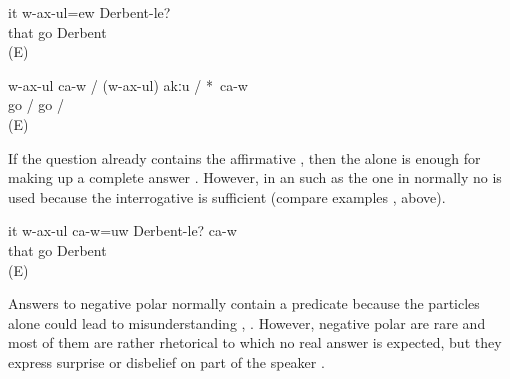 \begin{exe}
	\ex	\label{ex:Is he going to Derbent}
	\gll	it	w-ax-ul=ew	Derbent-le?\\
		that	go	Derbent\\
	\glt	{} (E)

	\ex	\label{ex:He is going / not going}
	\gll	w-ax-ul		ca-w	/	(w-ax-ul)		akːu		/	*~ca-w\\
		go		/	go		/	{\hphantom{*}}~\\
	\glt	{} (E)
\end{exe}

If the question already contains the affirmative , then the  alone is enough for making up a complete answer . However, in an  such as the one in  normally no  is used because the interrogative  is sufficient (compare examples ,  above).

\begin{exe}
	\ex	\label{ex:Is he going to Derbent? Yes, he is}
	\gll	it	w-ax-ul	ca-w=uw	Derbent-le?	ca-w\\
		that	go		Derbent	\\
	\glt	{} (E)
\end{exe}

Answers to negative polar  normally contain a predicate because the particles alone could lead to misunderstanding , . However, negative polar  are rare and most of them are rather rhetorical  to which no real answer is expected, but they express surprise or disbelief on part of the speaker . 

